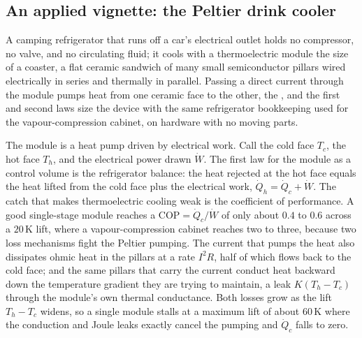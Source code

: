 \subsection*{An applied vignette: the Peltier drink cooler}

A camping refrigerator that runs off a car's electrical outlet holds no
compressor, no valve, and no circulating fluid; it cools with a thermoelectric
module the size of a coaster, a flat ceramic sandwich of many small
semiconductor pillars wired electrically in series and thermally in parallel.
Passing a direct current through the module pumps heat from one ceramic face to
the other, the , and the first and second laws size the
device with the same refrigerator bookkeeping used for the vapour-compression
cabinet, on hardware with no moving parts.

The module is a heat pump driven by electrical work. Call the cold face $T_c$,
the hot face $T_h$, and the electrical power drawn $\dot W$. The first law for the
module as a control volume is the refrigerator balance: the heat rejected at the
hot face equals the heat lifted from the cold face plus the electrical work,
$\dot Q_h = \dot Q_c + \dot W$. The catch that makes thermoelectric cooling weak
is the coefficient of performance. A good single-stage module reaches a
$\text{COP} = \dot Q_c/\dot W$ of only about $0.4$ to $0.6$ across a
$20\,\si{\kelvin}$ lift, where a vapour-compression cabinet reaches two to three,
because two loss mechanisms fight the Peltier pumping. The current that pumps the
heat also dissipates ohmic heat in the pillars at a rate $I^2 R$, half of which
flows back to the cold face; and the same pillars that carry the current conduct
heat backward down the temperature gradient they are trying to maintain, a leak
$K(T_h - T_c)$ through the module's own thermal conductance. Both losses grow as
the lift $T_h - T_c$ widens, so a single module stalls at a maximum lift of about
$60\,\si{\kelvin}$ where the conduction and Joule leaks exactly cancel the
pumping and $\dot Q_c$ falls to zero.

